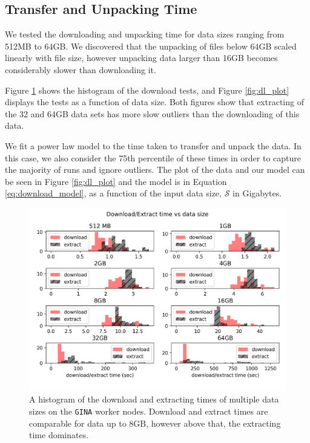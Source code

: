 \documentclass[preprint,5p]{elsarticle}
\begin{document}
\subsection{Transfer and Unpacking Time}\label{sec:results_dl}

We tested the downloading and unpacking time for data sizes ranging from 512MB to 64GB. We discovered that the unpacking of files below 64GB scaled linearly with file size, however unpacking data larger than 16GB becomes considerably slower than downloading it. 

Figure \ref{fig:dl_hist} shows the histogram of the download tests, and Figure \ref{fig:dl_plot} displays the tests as a function of data size. Both figures show that extracting of the 32 and 64GB data sets has more slow outliers than the downloading of this data. 

We fit a power law model to the time taken to transfer and unpack the data. In this case, we also consider the 75th percentile of these times in order to capture the majority of runs and ignore outliers. The plot of the data and our model can be seen in Figure \ref{fig:dl_plot} and the model is in Equation \ref{eq:download_model}, as a function of the input data size, $\mathcal{S} $ in Gigabytes.

\begin{figure}
    \includegraphics[width=0.95\linewidth]{figures/dl_ex_hatched.png}
      \caption{A histogram of the download and extracting times of multiple data sizes on the \texttt{GINA} worker nodes. Download and extract times are comparable for data up to 8GB, however above that, the extracting time dominates.  }
	\label{fig:dl_hist}
\end{figure}
\end{document}
